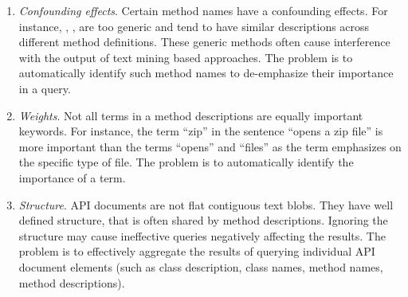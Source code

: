 \begin{enumerate}
		
	\item \textit{Confounding effects}. Certain method names have a confounding effects. For instance, , ,  are too generic and tend to have similar descriptions across different method definitions. These generic methods often cause interference with the output of text mining based approaches. The problem is to automatically identify such method names to de-emphasize their importance in a query. 
	
	\item \textit{Weights}. Not all terms in a method descriptions are equally important keywords. For instance, the term ``zip'' in the sentence ``opens a zip file'' is more important than the terms ``opens'' and ``files'' as the term emphasizes on the specific type of file. The problem is to automatically identify the importance of a term.
	
	\item \textit{Structure}. API documents are not flat contiguous text blobs. They have well defined structure, that is often shared by method descriptions. Ignoring the structure may cause ineffective queries negatively affecting the results. The problem is to effectively aggregate the results of querying individual API document elements (such as class description, class names, method names, method descriptions).
			
	
\end{enumerate}
